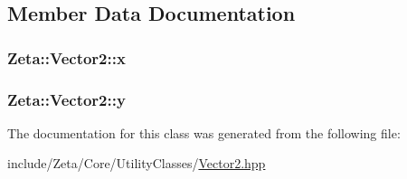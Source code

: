 \subsection{Member Data Documentation}
\hypertarget{classZeta_1_1Vector2_a88247cf58be67d2bf4d227b868a0102c}{
\subsubsection[{x}]{ Zeta\+::\+Vector2\+::x}}\label{classZeta_1_1Vector2_a88247cf58be67d2bf4d227b868a0102c}
\hypertarget{classZeta_1_1Vector2_ae6f0b675a313ecd00546812db89a177c}{
\subsubsection[{y}]{ Zeta\+::\+Vector2\+::y}}\label{classZeta_1_1Vector2_ae6f0b675a313ecd00546812db89a177c}


The documentation for this class was generated from the following file\+:\begin{DoxyCompactItemize}
\item 
include/\+Zeta/\+Core/\+Utility\+Classes/\hyperlink{Vector2_8hpp}{Vector2.\+hpp}\end{DoxyCompactItemize}
